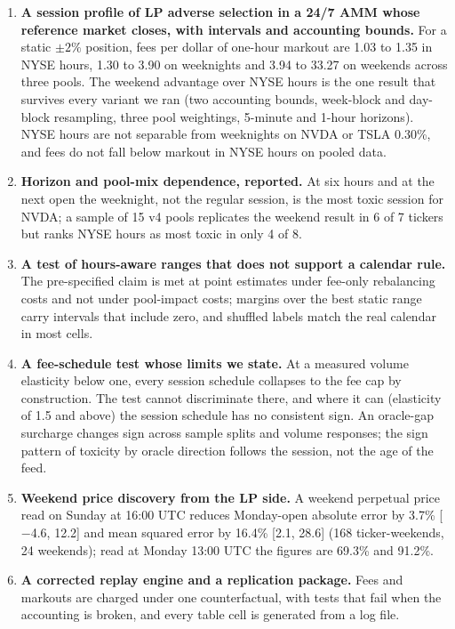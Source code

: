 \documentclass[11pt]{article}
\begin{document}
\begin{enumerate}[leftmargin=*,itemsep=2pt]
\item \textbf{A session profile of LP adverse selection in a 24/7 AMM whose reference market closes, with intervals and accounting bounds.} For a static $\pm2\%$ position, fees per dollar of one-hour markout are 1.03 to 1.35 in NYSE hours, 1.30 to 3.90 on weeknights and 3.94 to 33.27 on weekends across three pools. The weekend advantage over NYSE hours is the one result that survives every variant we ran (two accounting bounds, week-block and day-block resampling, three pool weightings, 5-minute and 1-hour horizons). NYSE hours are not separable from weeknights on NVDA or TSLA 0.30\%, and fees do not fall below markout in NYSE hours on pooled data.
\item \textbf{Horizon and pool-mix dependence, reported.} At six hours and at the next open the weeknight, not the regular session, is the most toxic session for NVDA; a sample of 15 v4 pools replicates the weekend result in 6 of 7 tickers but ranks NYSE hours as most toxic in only 4 of 8.
\item \textbf{A test of hours-aware ranges that does not support a calendar rule.} The pre-specified claim is met at point estimates under fee-only rebalancing costs and not under pool-impact costs; margins over the best static range carry intervals that include zero, and shuffled labels match the real calendar in most cells.
\item \textbf{A fee-schedule test whose limits we state.} At a measured volume elasticity below one, every session schedule collapses to the fee cap by construction. The test cannot discriminate there, and where it can (elasticity of 1.5 and above) the session schedule has no consistent sign. An oracle-gap surcharge changes sign across sample splits and volume responses; the sign pattern of toxicity by oracle direction follows the session, not the age of the feed.
\item \textbf{Weekend price discovery from the LP side.} A weekend perpetual price read on Sunday at 16:00 UTC reduces Monday-open absolute error by 3.7\% [$-$4.6, 12.2] and mean squared error by 16.4\% [2.1, 28.6] (168 ticker-weekends, 24 weekends); read at Monday 13:00 UTC the figures are 69.3\% and 91.2\%.
\item \textbf{A corrected replay engine and a replication package.} Fees and markouts are charged under one counterfactual, with tests that fail when the accounting is broken, and every table cell is generated from a log file.
\end{enumerate}
\end{document}
